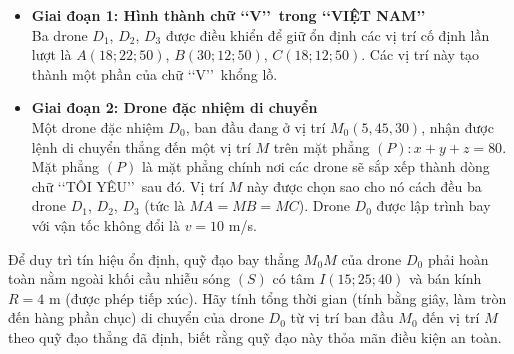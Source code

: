 \begin{bt}
{
	} 
	\begin{itemize}
		\item \textbf{Giai đoạn 1: Hình thành chữ \lq\lq V\rq\rq \  trong \lq\lq VIỆT NAM\rq \rq}\\
		Ba drone $D_1$, $D_2$, $D_3$ được điều khiển để giữ ổn định các vị trí cố định lần lượt là $A(18;22;50)$, $B(30;12;50)$, $C(18;12;50)$. Các  vị trí này tạo thành một phần của chữ \lq\lq V\rq\rq \ khổng lồ.
		\item \textbf{Giai đoạn  2: Drone đặc nhiệm di chuyển}\\
		Một drone đặc nhiệm $D_0$, ban đầu đang ở vị trí $M_0(5,45,30)$, nhận được lệnh di  chuyển thẳng đến một vị trí $M$ trên mặt phẳng $(P): x+y+z=80$. Mặt phẳng $(P)$ là mặt phẳng chính nơi các drone sẽ sắp xếp thành dòng chữ \lq\lq TÔI YÊU\rq\rq \ sau đó. Vị trí $M$ này được chọn sao cho nó cách đều ba drone $D_1$, $D_2$, $D_3$ (tức là $MA=MB=MC$). Drone $D_0$ được lập trình bay với vận tốc không đổi là $v=10$ m/s.
	\end{itemize}
	Để duy trì tín hiệu ổn định, quỹ đạo  bay thẳng $M_0M$ của drone $D_0$ phải hoàn toàn nằm ngoài khối cầu nhiễu sóng $(S)$ có tâm $I(15;25;40)$ và bán kính $R=4$ m (được phép tiếp xúc). Hãy tính tổng thời gian (tính bằng giây, làm tròn đến hàng phần chục) di chuyển của drone $D_0$ từ vị trí ban đầu $M_0$ đến vị trí $M$ theo quỹ đạo thẳng đã định, biết rằng quỹ đạo này thỏa mãn điều kiện an toàn.
\end{bt}
